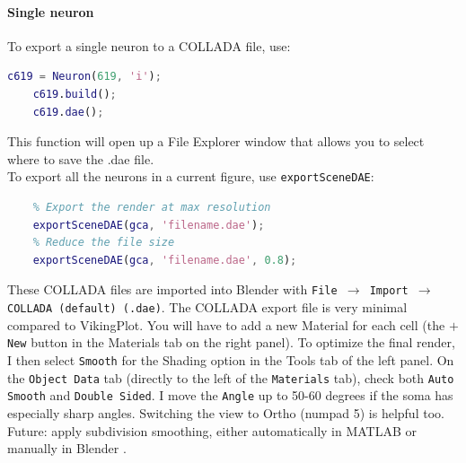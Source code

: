 \documentclass[12pt]{exam}
\begin{document}
	\paragraph{Single neuron} To export a single neuron to a COLLADA file, use:
	\begin{lstlisting}[language=matlab]
	c619 = Neuron(619, 'i');
	c619.build();
	c619.dae();\end{lstlisting}
	This function will open up a File Explorer window that allows you to select where to save the .dae file.\\
	
	To export all the neurons in a current figure, use \texttt{exportSceneDAE}:
	\begin{lstlisting}[language=matlab]
	% exportSceneDAE(axesHandle, filename, reductionFactor)
	% Export the render at max resolution
	exportSceneDAE(gca, 'filename.dae');
	% Reduce the file size
	exportSceneDAE(gca, 'filename.dae', 0.8);\end{lstlisting}
	
	These COLLADA files are imported into Blender with \texttt{File $\rightarrow$ Import $\rightarrow$ COLLADA (default) (.dae)}. The COLLADA export file is very minimal compared to VikingPlot. You will have to add a new Material for each cell (the \texttt{$+$ New} button in the Materials tab on the right panel). To optimize the final render, I then select \texttt{Smooth} for the Shading option in the Tools tab of the left panel. On the \texttt{Object Data} tab (directly to the left of the \texttt{Materials} tab), check both \texttt{Auto Smooth} and \texttt{Double Sided}. I move the \texttt{Angle} up to 50-60 degrees if the soma has especially sharp angles. Switching the view to Ortho (numpad 5) is helpful too.\\
	Future: apply subdivision smoothing, either automatically in MATLAB \cite{Zorin2000} or manually in Blender \cite{borncg8}.
\end{document}
